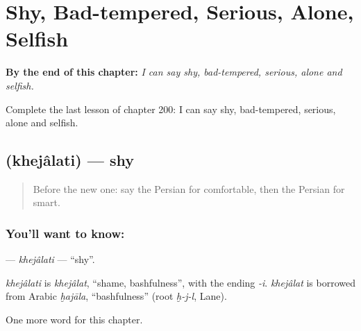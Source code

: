 
\chapter{Shy, Bad-tempered, Serious, Alone, Selfish}
\label{ch:fa-shy-bad-tempered-serious-alone-selfish}

\begin{chapteropening}
\textbf{By the end of this chapter:} \emph{I can say shy, bad-tempered, serious, alone and selfish.}

Complete the last lesson of chapter 200: I can say shy, bad-tempered, serious, alone and selfish.
\end{chapteropening}

\section[\texorpdfstring{\fa{خجالتی} (khejâlati)}{خجالتی (khejâlati)}]{ (khejâlati) — shy}

\label{lesson:FA-C200-khejalati}



\begin{quote}
Before the new one: say the Persian for comfortable, then the Persian for smart.
\end{quote}

\subsection*{You'll want to know: }
\textbf{} — \emph{khejâlati} — \textquotedblleft{}shy\textquotedblright{}.

\begin{cousinweb}
\emph{khejâlati} is \emph{khejâlat}, \textquotedblleft{}shame, bashfulness\textquotedblright{}, with the ending \emph{-i}. \emph{khejâlat} is borrowed from Arabic \emph{ḫajāla}, \textquotedblleft{}bashfulness\textquotedblright{} (root \emph{ḫ-j-l}, Lane).
\end{cousinweb}

\begin{grammarlens}[title={What you've built}]
One more word for this chapter.
\end{grammarlens}

